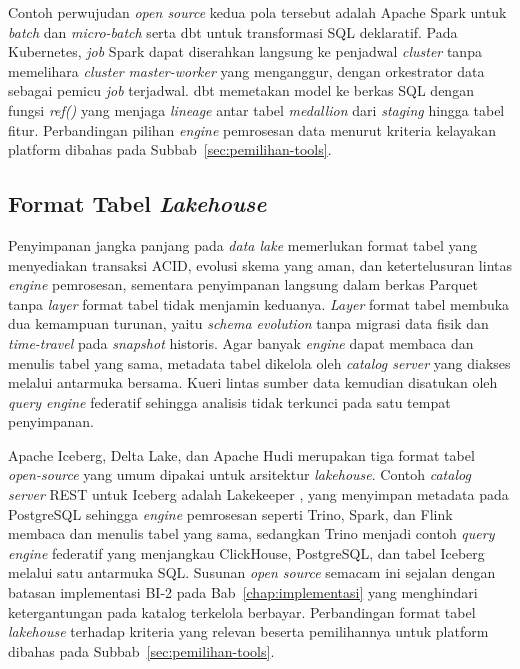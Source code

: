 Contoh perwujudan \textit{open source} kedua pola tersebut adalah Apache Spark \autocite{apachespark2024} untuk \textit{batch} dan \textit{micro-batch} serta dbt \autocite{dbt2025} untuk transformasi SQL deklaratif. Pada Kubernetes, \textit{job} Spark dapat diserahkan langsung ke penjadwal \textit{cluster} tanpa memelihara \textit{cluster} \textit{master-worker} yang menganggur, dengan orkestrator data sebagai pemicu \textit{job} terjadwal. dbt memetakan model ke berkas SQL dengan fungsi \textit{ref()} yang menjaga \textit{lineage} antar tabel \textit{medallion} dari \textit{staging} hingga tabel fitur. Perbandingan pilihan \textit{engine} pemrosesan data menurut kriteria kelayakan platform dibahas pada Subbab~\ref{sec:pemilihan-tools}.

\subsection{Format Tabel \textit{Lakehouse}}
\label{subsec:lakehouse-format}

Penyimpanan jangka panjang pada \textit{data lake} memerlukan format tabel yang menyediakan transaksi ACID, evolusi skema yang aman, dan ketertelusuran lintas \textit{engine} pemrosesan, sementara penyimpanan langsung dalam berkas Parquet tanpa \textit{layer} format tabel tidak menjamin keduanya. \textit{Layer} format tabel membuka dua kemampuan turunan, yaitu \textit{schema evolution} tanpa migrasi data fisik dan \textit{time-travel} pada \textit{snapshot} historis. Agar banyak \textit{engine} dapat membaca dan menulis tabel yang sama, metadata tabel dikelola oleh \textit{catalog server} yang diakses melalui antarmuka bersama. Kueri lintas sumber data kemudian disatukan oleh \textit{query engine} federatif sehingga analisis tidak terkunci pada satu tempat penyimpanan.

Apache Iceberg, Delta Lake, dan Apache Hudi merupakan tiga format tabel \textit{open-source} yang umum dipakai untuk arsitektur \textit{lakehouse}. Contoh \textit{catalog server} REST untuk Iceberg adalah Lakekeeper \autocite{lakekeeper2025}, yang menyimpan metadata pada PostgreSQL sehingga \textit{engine} pemrosesan seperti Trino, Spark, dan Flink membaca dan menulis tabel yang sama, sedangkan Trino \autocite{trino2024} menjadi contoh \textit{query engine} federatif yang menjangkau ClickHouse, PostgreSQL, dan tabel Iceberg melalui satu antarmuka SQL. Susunan \textit{open source} semacam ini sejalan dengan batasan implementasi BI-2 pada Bab~\ref{chap:implementasi} yang menghindari ketergantungan pada katalog terkelola berbayar. Perbandingan format tabel \textit{lakehouse} terhadap kriteria yang relevan beserta pemilihannya untuk platform dibahas pada Subbab~\ref{sec:pemilihan-tools}.

